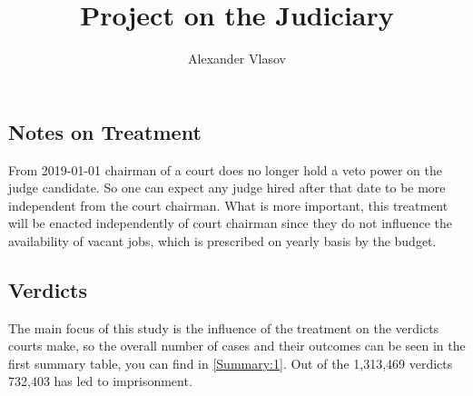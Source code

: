 \documentclass[a4paper,12pt]{article}
\author{Alexander Vlasov}
\title{Project on the Judiciary}
\begin{document}
\maketitle 


\subsection*{Notes on Treatment}
From 2019-01-01 chairman of a court does no longer hold a veto power on the judge candidate. So one can expect any judge hired after that date to be more independent from the court chairman. 
What is more important, this treatment will be enacted independently of court chairman since they do not influence the availability of vacant jobs, which is prescribed on yearly basis by the budget. 


\subsection*{Verdicts}
The main focus of this study is the influence of the treatment on the verdicts courts make, so the overall number of cases and their outcomes can be seen in the first summary table, you can find in \vref{Summary:1}. Out of the 1,313,469 verdicts 732,403 has led to imprisonment.
\end{document}
